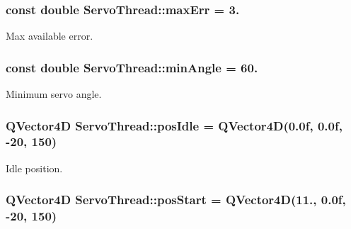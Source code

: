 \hypertarget{a00009_a3ecb7da23afe91883435f239bd08ceb3}{}
\subsubsection[{max\+Err}]{\setlength{\rightskip}{0pt plus 5cm}const double Servo\+Thread\+::max\+Err = 3.\hspace{0.3cm}{\ttfamily [private]}}\label{a00009_a3ecb7da23afe91883435f239bd08ceb3}


Max available error. 

\hypertarget{a00009_a9af4e0214b1b5c64978bbef49cde6d3c}{}
\subsubsection[{min\+Angle}]{\setlength{\rightskip}{0pt plus 5cm}const double Servo\+Thread\+::min\+Angle = 60.\hspace{0.3cm}{\ttfamily [private]}}\label{a00009_a9af4e0214b1b5c64978bbef49cde6d3c}


Minimum servo angle. 

\hypertarget{a00009_a22328f2a08b4a154a275242ee185aebf}{}
\subsubsection[{pos\+Idle}]{\setlength{\rightskip}{0pt plus 5cm}Q\+Vector4\+D Servo\+Thread\+::pos\+Idle = Q\+Vector4\+D(0.\+0f, 0.\+0f, -\/20, 150)\hspace{0.3cm}{\ttfamily [private]}}\label{a00009_a22328f2a08b4a154a275242ee185aebf}


Idle position. 

\hypertarget{a00009_a232fd9d19e8f1be1d42b5801460137c6}{}
\subsubsection[{pos\+Start}]{\setlength{\rightskip}{0pt plus 5cm}Q\+Vector4\+D Servo\+Thread\+::pos\+Start = Q\+Vector4\+D(11., 0.\+0f, -\/20, 150)\hspace{0.3cm}{\ttfamily [private]}}\label{a00009_a232fd9d19e8f1be1d42b5801460137c6}


